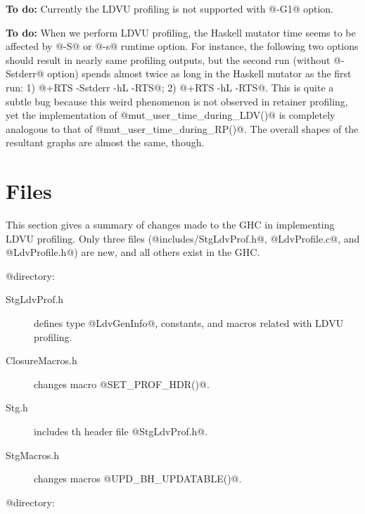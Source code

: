 \documentclass{article}
\begin{document}
\textbf{To do:} Currently the LDVU profiling is not supported with @-G1@ option.

\textbf{To do:} When we perform LDVU profiling, the Haskell mutator time seems to
be affected by @-S@ or @-s@ runtime option. For instance, the following 
two options should result in nearly same profiling outputs, but
the second run (without @-Sstderr@ option) spends almost twice as
long in the Haskell mutator as the first run:
1) @+RTS -Sstderr -hL -RTS@; 2) @+RTS -hL -RTS@.
This is quite a subtle bug because this weird phenomenon is not 
observed in retainer profiling, yet the implementation of 
@mut_user_time_during_LDV()@ is completely analogous to that of 
@mut_user_time_during_RP()@. The overall shapes of the resultant graphs 
are almost the same, though.

\section{Files}

This section gives a summary of changes made to the GHC in 
implementing LDVU profiling.
Only three files (@includes/StgLdvProf.h@, @LdvProfile.c@, and 
@LdvProfile.h@) are new, and all others exist in the GHC.

@ directory:

\begin{description}
\item[StgLdvProf.h] defines type @LdvGenInfo@, constants, and macros related
with LDVU profiling.
\item[ClosureMacros.h] changes macro @SET_PROF_HDR()@.
\item[Stg.h] includes th header file @StgLdvProf.h@.
\item[StgMacros.h] changes macros @UPD_BH_UPDATABLE()@.
\end{description}

@\rts@ directory:
\end{document}
